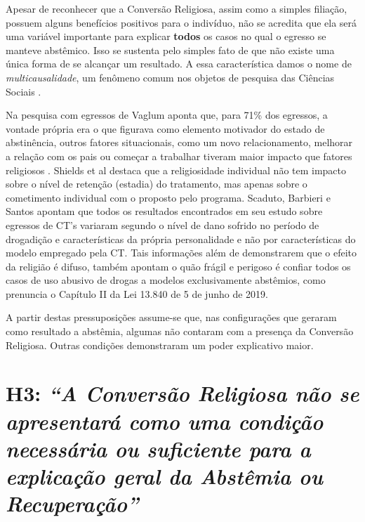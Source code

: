\documentclass[
	12pt,				%
	oneside,			%
	a4paper,			%
	sumario=tradicional,
	english,			%
	brazil				%
	]{abntex2}
\begin{document}
Apesar de reconhecer que a Conversão Religiosa, assim como a simples filiação, possuem alguns benefícios positivos para o indivíduo, não se acredita que ela será uma variável importante para explicar \textbf{todos} os casos no qual o egresso se manteve abstêmico. Isso se sustenta pelo simples fato de que não existe uma única forma de se alcançar um resultado. A essa característica damos o nome de \emph{multicausalidade}, um fenômeno comum nos objetos de pesquisa das Ciências Sociais \autocite{schneider_set-theoretic_2012}.

Na pesquisa com egressos de Vaglum \autocite*{vaglum_why_1985} aponta que, para 71\% dos egressos, a vontade própria era o que figurava como elemento motivador do estado de abstinência, outros fatores situacionais, como um novo relacionamento, melhorar a relação com os pais ou começar a trabalhar tiveram maior impacto que fatores religiosos \autocite[351]{vaglum_why_1985}. Shields et al \autocite*[367]{shields_religion_2007} destaca que a religiosidade individual não tem impacto sobre o nível de retenção (estadia) do tratamento, mas apenas sobre o cometimento individual com o proposto pelo programa. Scaduto, Barbieri e Santos \autocite*[167]{scaduto_comunidades_2014} apontam que todos os resultados encontrados em seu estudo sobre egressos de CT's variaram segundo o nível de dano sofrido no período de drogadição e características da própria personalidade e não por características do modelo empregado pela CT. Tais informações além de demonstrarem que o efeito da religião é difuso, também apontam o quão frágil e perigoso é confiar todos os casos de uso abusivo de drogas a modelos exclusivamente abstêmios, como prenuncia o Capítulo II da Lei 13.840 de 5 de junho de 2019.

A partir destas pressuposições assume-se que, nas configurações que geraram como resultado a abstêmia, algumas não contaram com a presença da Conversão Religiosa. Outras condições demonstraram um poder explicativo maior.

\hypertarget{h3-a-conversuxe3o-religiosa-nuxe3o-se-apresentaruxe1-como-uma-condiuxe7uxe3o-necessuxe1ria-ou-suficiente-para-a-explicauxe7uxe3o-geral-da-abstuxeamia-ou-recuperauxe7uxe3o}{%
\section{\texorpdfstring{\textbf{H3}: \emph{``A Conversão Religiosa não se apresentará como uma condição necessária ou suficiente para a explicação geral da Abstêmia ou Recuperação''}}{H3: ``A Conversão Religiosa não se apresentará como uma condição necessária ou suficiente para a explicação geral da Abstêmia ou Recuperação''}}\label{h3-a-conversuxe3o-religiosa-nuxe3o-se-apresentaruxe1-como-uma-condiuxe7uxe3o-necessuxe1ria-ou-suficiente-para-a-explicauxe7uxe3o-geral-da-abstuxeamia-ou-recuperauxe7uxe3o}}
\end{document}
